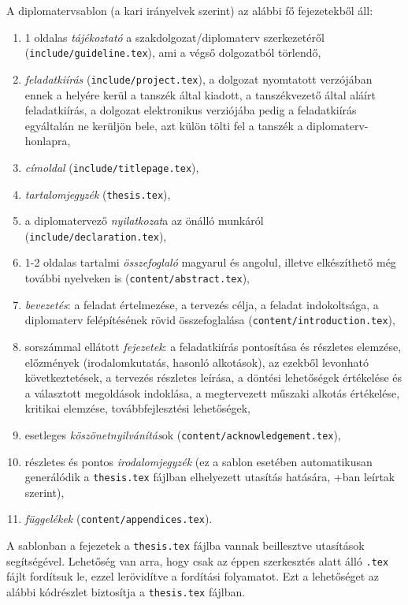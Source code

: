 A diplomatervsablon (a kari irányelvek szerint) az alábbi fő fejezetekből áll:
\begin{enumerate}
	\item 1 oldalas \emph{tájékoztató} a szakdolgozat/diplomaterv szerkezetéről (\verb+include/guideline.tex+), ami a végső dolgozatból törlendő,
	\item \emph{feladatkiírás} (\verb+include/project.tex+), a dolgozat nyomtatott verzójában ennek a helyére kerül a tanszék által kiadott, a tanszékvezető által aláírt feladatkiírás, a dolgozat elektronikus verziójába pedig a feladatkiírás egyáltalán ne kerüljön bele, azt külön tölti fel a tanszék a diplomaterv-honlapra,
	\item \emph{címoldal} (\verb+include/titlepage.tex+),
	\item \emph{tartalomjegyzék} (\verb+thesis.tex+),
	\item a diplomatervező \emph{nyilatkozat}a az önálló munkáról (\verb+include/declaration.tex+),
	\item 1-2 oldalas tartalmi \emph{összefoglaló} magyarul és angolul, illetve elkészíthető még további nyelveken is (\verb+content/abstract.tex+),
	\item \emph{bevezetés}: a feladat értelmezése, a tervezés célja, a feladat indokoltsága, a diplomaterv felépítésének rövid összefoglalása (\verb+content/introduction.tex+),
	\item sorszámmal ellátott \emph{fejezetek}: a feladatkiírás pontosítása és részletes elemzése, előzmények (irodalomkutatás, hasonló alkotások), az ezekből levonható következtetések, a tervezés részletes leírása, a döntési lehetőségek értékelése és a választott megoldások indoklása, a megtervezett műszaki alkotás értékelése, kritikai elemzése, továbbfejlesztési lehetőségek,
	\item esetleges \emph{köszönetnyilvánítás}ok (\verb+content/acknowledgement.tex+),
	\item részletes és pontos \emph{irodalomjegyzék} (ez a sablon esetében automatikusan generálódik a \verb+thesis.tex+ fájlban elhelyezett \verb++ utasítás hatására, \az+ban leírtak szerint),
	\item \emph{függelékek} (\verb+content/appendices.tex+).
\end{enumerate}

A sablonban a fejezetek a \verb+thesis.tex+ fájlba vannak beillesztve \verb++ utasítások segítségével. Lehetőség van arra, hogy csak az éppen szerkesztés alatt álló \verb+.tex+ fájlt fordítsuk le, ezzel lerövidítve a fordítási folyamatot. Ezt a lehetőséget az alábbi kódrészlet biztosítja a \verb+thesis.tex+ fájlban.
\begin{lstlisting}

\end{lstlisting}

